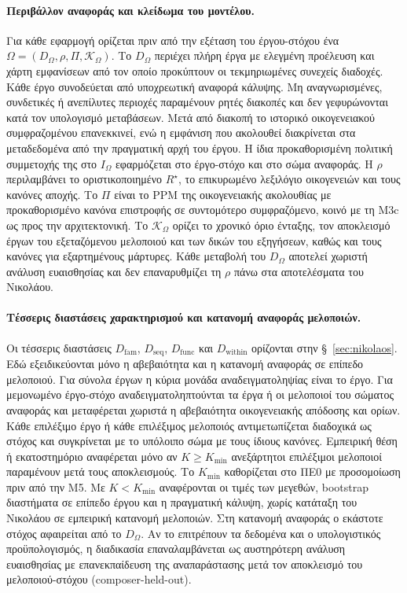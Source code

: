 \documentclass[11pt,a4paper]{article}
\begin{document}
\paragraph{Περιβάλλον αναφοράς και κλείδωμα του μοντέλου.}
Για κάθε εφαρμογή ορίζεται πριν από την εξέταση του έργου-στόχου ένα $\Omega=(D_{\Omega},\rho,\Pi,\mathcal K_{\Omega})$. Το $D_{\Omega}$ περιέχει πλήρη έργα με ελεγμένη προέλευση και χάρτη εμφανίσεων από τον οποίο προκύπτουν οι τεκμηριωμένες συνεχείς διαδοχές. Κάθε έργο συνοδεύεται από υποχρεωτική αναφορά κάλυψης. Μη αναγνωρισμένες, συνδετικές ή ανεπίλυτες περιοχές παραμένουν ρητές διακοπές και δεν γεφυρώνονται κατά τον υπολογισμό μεταβάσεων. Μετά από διακοπή το ιστορικό οικογενειακού συμφραζομένου επανεκκινεί, ενώ η εμφάνιση που ακολουθεί διακρίνεται στα μεταδεδομένα από την πραγματική αρχή του έργου. Η ίδια προκαθορισμένη πολιτική συμμετοχής της στο $I_{\Omega}$ εφαρμόζεται στο έργο-στόχο και στο σώμα αναφοράς. Η $\rho$ περιλαμβάνει το οριστικοποιημένο $R^\star$, το επικυρωμένο λεξιλόγιο οικογενειών και τους κανόνες αποχής. Το $\Pi$ είναι το PPM της οικογενειακής ακολουθίας με προκαθορισμένο κανόνα επιστροφής σε συντομότερο συμφραζόμενο, κοινό με τη M3c ως προς την αρχιτεκτονική. Το $\mathcal K_{\Omega}$ ορίζει το χρονικό όριο ένταξης, τον αποκλεισμό έργων του εξεταζόμενου μελοποιού και των δικών του εξηγήσεων, καθώς και τους κανόνες για εξαρτημένους μάρτυρες. Κάθε μεταβολή του $D_{\Omega}$ αποτελεί χωριστή ανάλυση ευαισθησίας και δεν επαναρυθμίζει τη $\rho$ πάνω στα αποτελέσματα του Νικολάου.

\paragraph{Τέσσερις διαστάσεις χαρακτηρισμού και κατανομή αναφοράς μελοποιών.}
Οι τέσσερις διαστάσεις $D_{\mathrm{fam}}$, $D_{\mathrm{seq}}$, $D_{\mathrm{func}}$ και $D_{\mathrm{within}}$ ορίζονται στην §~\ref{sec:nikolaos}. Εδώ εξειδικεύονται μόνο η αβεβαιότητα και η κατανομή αναφοράς σε επίπεδο μελοποιού. Για σύνολα έργων η κύρια μονάδα αναδειγματοληψίας είναι το έργο. Για μεμονωμένο έργο-στόχο αναδειγματοληπτούνται τα έργα ή οι μελοποιοί του σώματος αναφοράς και μεταφέρεται χωριστά η αβεβαιότητα οικογενειακής απόδοσης και ορίων. Κάθε επιλέξιμο έργο ή κάθε επιλέξιμος μελοποιός αντιμετωπίζεται διαδοχικά ως στόχος και συγκρίνεται με το υπόλοιπο σώμα με τους ίδιους κανόνες. Εμπειρική θέση ή εκατοστημόριο αναφέρεται μόνο αν $K\ge K_{\min}$ ανεξάρτητοι επιλέξιμοι μελοποιοί παραμένουν μετά τους αποκλεισμούς. Το $K_{\min}$ καθορίζεται στο ΠΕ0 με προσομοίωση πριν από την M5. Με $K<K_{\min}$ αναφέρονται οι τιμές των μεγεθών, bootstrap διαστήματα σε επίπεδο έργου και η πραγματική κάλυψη, χωρίς κατάταξη του Νικολάου σε εμπειρική κατανομή μελοποιών. Στη κατανομή αναφοράς ο εκάστοτε στόχος αφαιρείται από το $D_{\Omega}$. Αν το επιτρέπουν τα δεδομένα και ο υπολογιστικός προϋπολογισμός, η διαδικασία επαναλαμβάνεται ως αυστηρότερη ανάλυση ευαισθησίας με επανεκπαίδευση της αναπαράστασης μετά τον αποκλεισμό του μελοποιού-στόχου (composer-held-out).
\end{document}
